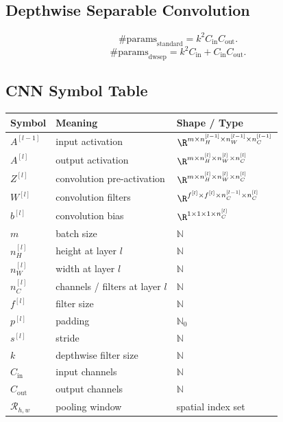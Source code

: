 \subsection{Depthwise Separable Convolution}

\[
\#\mathrm{params}_{\mathrm{standard}}
=
k^2 C_{\mathrm{in}} C_{\mathrm{out}}.
\]
\[
\#\mathrm{params}_{\mathrm{dwsep}}
=
k^2 C_{\mathrm{in}}
+
C_{\mathrm{in}} C_{\mathrm{out}}.
\]

\subsection{CNN Symbol Table}

\begin{center}
\begin{tabular}{lll}
\toprule
Symbol & Meaning & Shape / Type \\
\midrule
$A^{[l-1]}$ & input activation & $\R^{m \times n_H^{[l-1]} \times n_W^{[l-1]} \times n_C^{[l-1]}}$ \\
$A^{[l]}$ & output activation & $\R^{m \times n_H^{[l]} \times n_W^{[l]} \times n_C^{[l]}}$ \\
$Z^{[l]}$ & convolution pre-activation & $\R^{m \times n_H^{[l]} \times n_W^{[l]} \times n_C^{[l]}}$ \\
$W^{[l]}$ & convolution filters & $\R^{f^{[l]} \times f^{[l]} \times n_C^{[l-1]} \times n_C^{[l]}}$ \\
$b^{[l]}$ & convolution bias & $\R^{1 \times 1 \times 1 \times n_C^{[l]}}$ \\
$m$ & batch size & $\mathbb{N}$ \\
$n_H^{[l]}$ & height at layer $l$ & $\mathbb{N}$ \\
$n_W^{[l]}$ & width at layer $l$ & $\mathbb{N}$ \\
$n_C^{[l]}$ & channels / filters at layer $l$ & $\mathbb{N}$ \\
$f^{[l]}$ & filter size & $\mathbb{N}$ \\
$p^{[l]}$ & padding & $\mathbb{N}_0$ \\
$s^{[l]}$ & stride & $\mathbb{N}$ \\
$k$ & depthwise filter size & $\mathbb{N}$ \\
$C_{\mathrm{in}}$ & input channels & $\mathbb{N}$ \\
$C_{\mathrm{out}}$ & output channels & $\mathbb{N}$ \\
$\mathcal{R}_{h,w}$ & pooling window & spatial index set \\
\bottomrule
\end{tabular}
\end{center}
